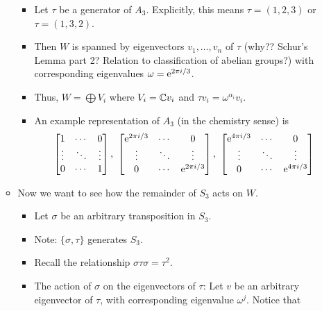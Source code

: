 \documentclass[../notes.tex]{subfiles}
\begin{document}
\begin{itemize}
\begin{itemize}
\begin{itemize}
            \item Let $\tau$ be a generator of $A_3$. Explicitly, this means $\tau=(1,2,3)$ or $\tau=(1,3,2)$.
            \item Then $W$ is spanned by eigenvectors $v_1,\dots,v_n$ of $\tau$ (why?? Schur's Lemma part 2? Relation to classification of abelian groups?) with corresponding eigenvalues $\omega=\e[2\pi i/3]$.
            \item Thus, $W=\bigoplus V_i$ where $V_i=\C v_i$ and $\tau v_i=\omega^{\alpha_i}v_i$.
            \item An example representation of $A_3$ (in the chemistry sense) is
            \begin{equation*}
                \begin{bmatrix}
                    1 & \cdots & 0\\
                    \vdots & \ddots & \vdots\\
                    0 & \cdots & 1\\
                \end{bmatrix},\
                \begin{bmatrix}
                    \e[2\pi i/3] & \cdots & 0\\
                    \vdots & \ddots & \vdots\\
                    0 & \cdots & \e[2\pi i/3]\\
                \end{bmatrix},\
                \begin{bmatrix}
                    \e[4\pi i/3] & \cdots & 0\\
                    \vdots & \ddots & \vdots\\
                    0 & \cdots & \e[4\pi i/3]\\
                \end{bmatrix}
            \end{equation*}
        \end{itemize}
        \item Now we want to see how the remainder of $S_3$ acts on $W$.
        \begin{itemize}
            \item Let $\sigma$ be an arbitrary transposition in $S_3$.
            \item Note: $\{\sigma,\tau\}$ generates $S_3$.
            \item Recall the relationship $\sigma\tau\sigma=\tau^2$.
            \item The action of $\sigma$ on the eigenvectors of $\tau$: Let $v$ be an arbitrary eigenvector of $\tau$, with corresponding eigenvalue $\omega^j$. Notice that

\end{itemize}
\end{itemize}
\end{itemize}
\end{document}
